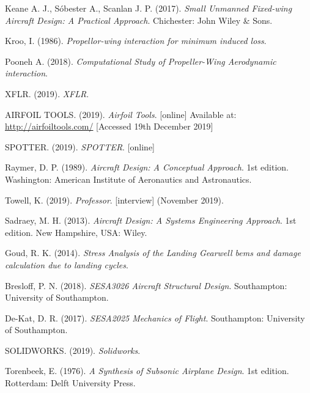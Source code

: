 \documentclass[../main.tex]{subfiles}
\begin{document}
\begin{thebibliography}{999}


  Keane A. J., S\'obester A., Scanlan J. P.
  (2017).
  \emph{Small Unmanned Fixed-wing Aircraft Design: A Practical Approach}.
  Chichester: John Wiley \& Sons.

Kroo, I.
(1986).
\emph{Propellor-wing interaction for minimum induced loss}.

  Pooneh A.
  (2018).
  \emph{Computational Study of Propeller-Wing Aerodynamic interaction}.

  XFLR.
  (2019).
  \emph{XFLR}.

  AIRFOIL TOOLS.
  (2019).
  \emph{Airfoil Tools}.
  [online]
  Available at:
  \url{http://airfoiltools.com/}
  [Accessed 19th December 2019]

  SPOTTER.
  (2019).
  \emph{SPOTTER}.
  [online]

  Raymer, D. P.
  (1989).
  \emph{Aircraft Design: A Conceptual Approach}.
  1st edition.
  Washington: American Institute of Aeronautics and Astronautics.

  Towell, K.
  (2019).
  \emph{Professor}.
  [interview]
  (November 2019).

  Sadraey, M. H.
  (2013).
  \emph{Aircraft Design: A Systems Engineering Approach}.
  1st edition.
  New Hampshire, USA: Wiley.

  Goud, R. K.
  (2014).
  \emph{Stress Analysis of the Landing Gearwell bems and damage calculation due to landing cycles}.


  Bresloff, P. N.
  (2018).
  \emph{SESA3026 Aircraft Structural Design}.
  Southampton: University of Southampton.

  De-Kat, D. R.
  (2017).
  \emph{SESA2025 Mechanics of Flight}.
  Southampton: University of Southampton.

  SOLIDWORKS.
  (2019).
  \emph{Solidworks}.

  Torenbeek, E.
  (1976).
  \emph{A Synthesis of Subsonic Airplane Design}.
  1st edition.
  Rotterdam: Delft University Press.

\end{thebibliography}
\end{document}
